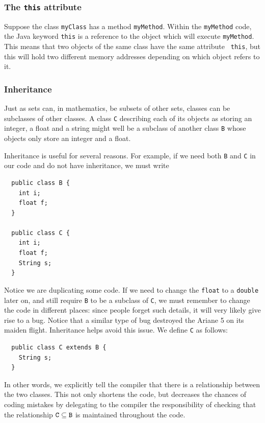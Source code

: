 \documentclass[a4paper]{book}
\theoremstyle{changebreak}                %
\begin{document}
\subsubsection{The {\tt this} attribute}
Suppose the class {\tt myClass} has a method {\tt myMethod}. Within
the {\tt myMethod} code, the Java keyword {\tt this}
is a reference to the object which will execute {\tt myMethod}. This
means that two objects of the same class have the same attribute {\tt
  this}, but this will hold two different memory addresses depending
on which object refers to it. 

\subsubsection{Inheritance}
Just as sets can, in mathematics, be subsets of other sets, classes
can be subclasses of other classes. A class {\tt C}
describing each of its objects as storing an integer, a
float and a string might well be a subclass of another class {\tt B}
whose objects only store an integer and a float.

Inheritance is useful for several reasons. For example, if we need
both {\tt B} and {\tt C} in our code and do not have inheritance, we
must write
\begin{verbatim}
  public class B {
    int i;
    float f;
  }

  public class C {
    int i;
    float f;
    String s;
  }
\end{verbatim}
Notice we are duplicating some code. If we
need to change the {\tt float} to a {\tt double} later on, and still
require {\tt B} to be a subclass of {\tt C}, we must remember to
change the code in different places: since people forget such details,
it will very likely give rise to a bug. Notice that a
similar type of bug destroyed the Ariane 5 on its
maiden flight. Inheritance helps avoid this issue. We define
{\tt C} as follows:
\begin{verbatim}
  public class C extends B {
    String s;
  }
\end{verbatim}
In other words, we explicitly tell the compiler that
there is a relationship between the two classes. This not only
shortens the code, but decreases the chances of coding mistakes by
delegating to the compiler the responsibility of checking that the
relationship $\mbox{\tt C}\subseteq\mbox{\tt B}$ is maintained
throughout the code.
\end{document}
